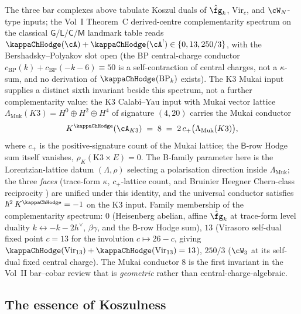 \begin{remark}
\label{rem:bar-cobar-2-theoremC-bucket}
The three bar complexes above tabulate Koszul duals of
$\hat{\fg}_k$, $\mathrm{Vir}_c$, and $\cW_N$-type inputs; the Vol~I
Theorem~C derived-centre complementarity spectrum on the classical
$\mathsf{G}/\mathsf{L}/\mathsf{C}/\mathsf{M}$ landmark table reads
$\kappaChHodge(\cA) + \kappaChHodge(\cA^!) \in \{0, 13, 250/3\}$,
with the Bershadsky--Polyakov slot open (the BP central-charge
conductor $c_{\mathrm{BP}}(k)+c_{\mathrm{BP}}(-k-6) \equiv 50$ is a
self-contraction of central charges, not a $\kappa$-sum, and no
derivation of $\kappaChHodge(\mathrm{BP}_k)$ exists). The
K3 Mukai input supplies a distinct sixth invariant beside this
spectrum, not a further complementarity value: the
K3 Calabi--Yau input with Mukai vector lattice
$\Lambda_{\mathrm{Muk}}(K3) = H^0\oplus H^2\oplus H^4$ of signature
$(4,20)$ carries the Mukai conductor
\[
K^{\kappaChHodge}(\cA_{K3}) \;=\; 8
\;=\; 2\,c_+\bigl(\Lambda_{\mathrm{Muk}}(K3)\bigr),
\]
where $c_+$ is the positive-signature count of the Mukai lattice;
the $\mathsf{B}$-row Hodge sum itself vanishes,
$\rho_K(\mathrm{K3}\times E) = 0$.
The B-family parameter here is the Lorentzian-lattice datum
$(\Lambda, \rho)$ selecting a polarisation direction inside
$\Lambda_{\mathrm{Muk}}$; the three \emph{faces}
(trace-form $\kappa$, $c_+$-lattice count, and Bruinier Heegner
Chern-class reciprocity \cite[Prop.~5.1]{Bru02}) are unified under
this identity, and the universal conductor satisfies
$\hbar^2\,K^{\kappaChHodge} = -1$ on the K3 input. Family
membership of the complementarity spectrum:
$0$ (Heisenberg abelian, affine $\hat{\fg}_k$ at trace-form level
duality $k\leftrightarrow -k-2h^\vee$, $\beta\gamma$, and the
$\mathsf{B}$-row Hodge sum), $13$ (Virasoro self-dual fixed point
$c=13$ for the involution $c\mapsto 26-c$, giving
$\kappaChHodge(\mathrm{Vir}_{13})+\kappaChHodge(\mathrm{Vir}_{13})=13$),
$250/3$ ($\cW_3$ at its self-dual fixed central charge). The Mukai
conductor $8$ is the first invariant in the Vol~II bar--cobar
review that is \emph{geometric} rather than
central-charge-algebraic.
\end{remark}

\subsection{The essence of Koszulness}
\label{subsec:koszulness-essence}

